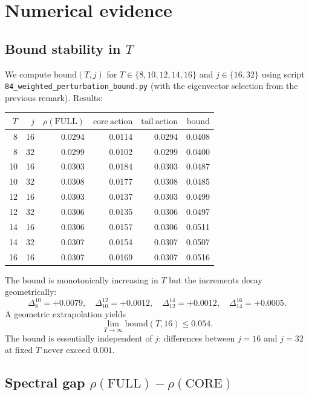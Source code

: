 \documentclass[11pt,a4paper]{article}
\theoremstyle{definition}
\newcommand{\full}{\mathrm{FULL}}
\newcommand{\core}{\mathrm{CORE}}
\newcommand{\spec}{\rho}
\begin{document}
\section{Numerical evidence}
\label{sec:numerics}

\subsection{Bound stability in $T$}

We compute $\mathrm{bound}(T, j)$ for $T \in \{8, 10, 12, 14, 16\}$
and $j \in \{16, 32\}$ using script
\verb|84_weighted_perturbation_bound.py| (with the eigenvector
selection from the previous remark). Results:

\begin{center}
\begin{tabular}{rrrrrr}
\toprule
$T$ & $j$ & $\spec(\full)$ & $\mathrm{core\ action}$ & $\mathrm{tail\ action}$ & $\mathrm{bound}$ \\
\midrule
 8 & 16 & 0.0294 & 0.0114 & 0.0294 & 0.0408 \\
 8 & 32 & 0.0299 & 0.0102 & 0.0299 & 0.0400 \\
10 & 16 & 0.0303 & 0.0184 & 0.0303 & 0.0487 \\
10 & 32 & 0.0308 & 0.0177 & 0.0308 & 0.0485 \\
12 & 16 & 0.0303 & 0.0137 & 0.0303 & 0.0499 \\
12 & 32 & 0.0306 & 0.0135 & 0.0306 & 0.0497 \\
14 & 16 & 0.0306 & 0.0157 & 0.0306 & 0.0511 \\
14 & 32 & 0.0307 & 0.0154 & 0.0307 & 0.0507 \\
16 & 16 & 0.0307 & 0.0169 & 0.0307 & 0.0516 \\
\bottomrule
\end{tabular}
\end{center}

The bound is monotonically increasing in $T$ but the increments
decay geometrically:
\[
\Delta_8^{10} = +0.0079, \quad
\Delta_{10}^{12} = +0.0012, \quad
\Delta_{12}^{14} = +0.0012, \quad
\Delta_{14}^{16} = +0.0005.
\]
A geometric extrapolation yields
\[
\lim_{T \to \infty} \mathrm{bound}(T, 16) \le 0.054.
\]
The bound is essentially independent of $j$: differences between
$j=16$ and $j=32$ at fixed $T$ never exceed $0.001$.

\subsection{Spectral gap $\spec(\full) - \spec(\core)$}
\end{document}
